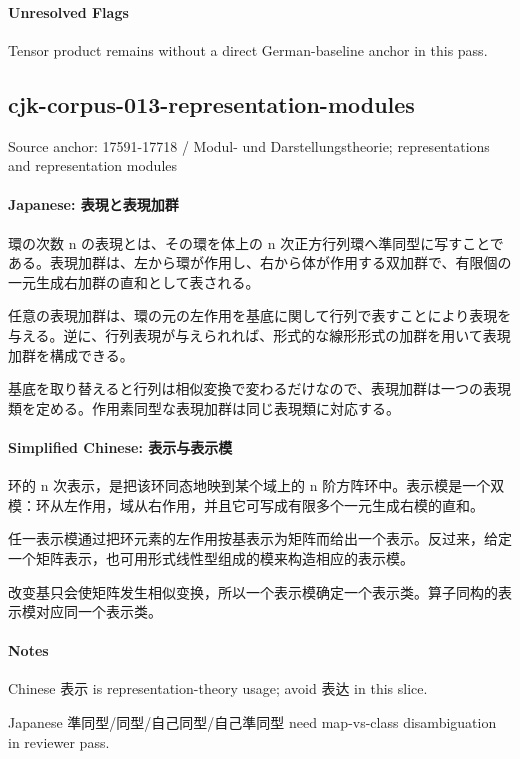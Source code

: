 \documentclass[11pt]{article}
\begin{document}
\paragraph{Unresolved Flags}
Tensor product remains without a direct German-baseline anchor in this pass.\par
\subsection*{cjk-corpus-013-representation-modules}
Source anchor: 17591-17718 / Modul- und Darstellungstheorie; representations and representation modules
\par
\paragraph{Japanese: 表現と表現加群}
環の次数 n の表現とは、その環を体上の n 次正方行列環へ準同型に写すことである。表現加群は、左から環が作用し、右から体が作用する双加群で、有限個の一元生成右加群の直和として表される。\par
任意の表現加群は、環の元の左作用を基底に関して行列で表すことにより表現を与える。逆に、行列表現が与えられれば、形式的な線形形式の加群を用いて表現加群を構成できる。\par
基底を取り替えると行列は相似変換で変わるだけなので、表現加群は一つの表現類を定める。作用素同型な表現加群は同じ表現類に対応する。\par
\paragraph{Simplified Chinese: 表示与表示模}
环的 n 次表示，是把该环同态地映到某个域上的 n 阶方阵环中。表示模是一个双模：环从左作用，域从右作用，并且它可写成有限多个一元生成右模的直和。\par
任一表示模通过把环元素的左作用按基表示为矩阵而给出一个表示。反过来，给定一个矩阵表示，也可用形式线性型组成的模来构造相应的表示模。\par
改变基只会使矩阵发生相似变换，所以一个表示模确定一个表示类。算子同构的表示模对应同一个表示类。\par
\paragraph{Notes}
Chinese 表示 is representation-theory usage; avoid 表达 in this slice.\par
Japanese 準同型/同型/自己同型/自己準同型 need map-vs-class disambiguation in reviewer pass.\par
\end{document}
